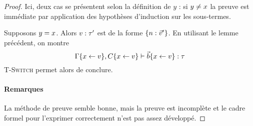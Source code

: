 \begin{lemma}
\begin{proof}
Ici, deux cas se présentent selon la définition de $y$ : si $y \neq x$ la
preuve est immédiate par application des hypothèses d'induction sur les
sous-termes. 

Supposons $y = x$. Alors $v : \tau'$ est de la forme $\{n : \vec{v}'\}$.
En utilisant le lemme précédent, on montre
$$\Gamma \{ x \leftarrow v \}, C \{ x \leftarrow v \}  \vdash \vec{b} \{ x \leftarrow v \} : \tau$$
\textsc{T-Switch} permet alors de conclure.

\paragraph{Remarques} La méthode de preuve semble bonne, mais la preuve est
  incomplète et le cadre formel pour l'exprimer correctement n'est pas assez
  développé.

\end{proof}
\end{lemma}

